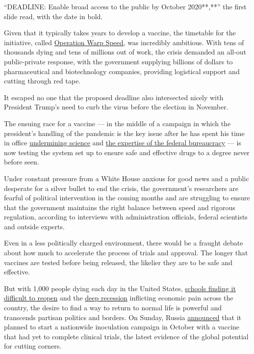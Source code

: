 ``DEADLINE: Enable broad access to the public by October 2020**,**'' the
first slide read, with the date in bold.

Given that it typically takes years to develop a vaccine, the timetable
for the initiative, called
\href{https://www.nytimes.com/2020/04/29/us/politics/trump-coronavirus-vaccine-operation-warp-speed.html}{Operation
Warp Speed}, was incredibly ambitious. With tens of thousands dying and
tens of millions out of work, the crisis demanded an all-out
public-private response, with the government supplying billions of
dollars to pharmaceutical and biotechnology companies, providing
logistical support and cutting through red tape.

It escaped no one that the proposed deadline also intersected nicely
with President Trump's need to curb the virus before the election in
November.

The ensuing race for a vaccine --- in the middle of a campaign in which
the president's handling of the pandemic is the key issue after he has
spent his time in office
\href{https://www.nytimes.com/2020/04/28/climate/trump-coronavirus-climate-science.html}{undermining
science} and
\href{https://www.nytimes.com/2020/07/09/climate/trump-hurricane-dorian-noaa.html}{the
expertise of the federal bureaucracy} --- is now testing the system set
up to ensure safe and effective drugs to a degree never before seen.

Under constant pressure from a White House anxious for good news and a
public desperate for a silver bullet to end the crisis, the government's
researchers are fearful of political intervention in the coming months
and are struggling to ensure that the government maintains the right
balance between speed and rigorous regulation, according to interviews
with administration officials, federal scientists and outside experts.

Even in a less politically charged environment, there would be a fraught
debate about how much to accelerate the process of trials and approval.
The longer that vaccines are tested before being released, the likelier
they are to be safe and effective.

But with 1,000 people dying each day in the United States,
\href{https://www.nytimes.com/interactive/2020/07/31/us/coronavirus-school-reopening-risk.html}{schools
finding it difficult to reopen} and the
\href{https://www.nytimes.com/2020/07/30/business/economy/q2-gdp-coronavirus-economy.html}{deep
recession} inflicting economic pain across the country, the desire to
find a way to return to normal life is powerful and transcends partisan
politics and borders. On Sunday, Russia
\href{https://www.nytimes.com/2020/08/02/world/europe/russia-trials-vaccine-October.html}{announced}
that it planned to start a nationwide inoculation campaign in October
with a vaccine that had yet to complete clinical trials, the latest
evidence of the global potential for cutting corners.

